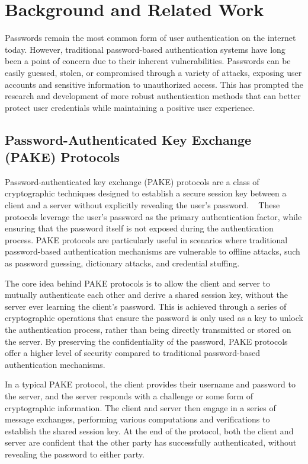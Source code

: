 \section{Background and Related Work}
\label{sec:relwork}

Passwords remain the most common form of user authentication on the internet today. However, traditional password-based authentication systems have long been a point of concern due to their inherent vulnerabilities. Passwords can be easily guessed, stolen, or compromised through a variety of attacks, exposing user accounts and sensitive information to unauthorized access. This has prompted the research and development of more robust authentication methods that can better protect user credentials while maintaining a positive user experience.

\subsection{Password-Authenticated Key Exchange (PAKE) Protocols}
\label{sec:pake}

Password-authenticated key exchange (PAKE) protocols are a class of cryptographic techniques designed to establish a secure session key between a client and a server without explicitly revealing the user's password. ~\cite{hao2022sokpake} These protocols leverage the user's password as the primary authentication factor, while ensuring that the password itself is not exposed during the authentication process. PAKE protocols are particularly useful in scenarios where traditional password-based authentication mechanisms are vulnerable to offline attacks, such as password guessing, dictionary attacks, and credential stuffing.

The core idea behind PAKE protocols is to allow the client and server to mutually authenticate each other and derive a shared session key, without the server ever learning the client's password. This is achieved through a series of cryptographic operations that ensure the password is only used as a key to unlock the authentication process, rather than being directly transmitted or stored on the server. By preserving the confidentiality of the password, PAKE protocols offer a higher level of security compared to traditional password-based authentication mechanisms.

In a typical PAKE protocol, the client provides their username and password to the server, and the server responds with a challenge or some form of cryptographic information. The client and server then engage in a series of message exchanges, performing various computations and verifications to establish the shared session key. At the end of the protocol, both the client and server are confident that the other party has successfully authenticated, without revealing the password to either party.

